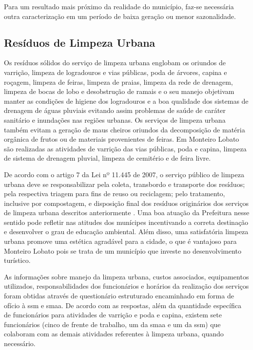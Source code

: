 Para um resultado mais próximo da realidade do município, faz-se necessária outra caracterização em um período de baixa geração ou menor sazonalidade.

\subsection{Resíduos de Limpeza Urbana}

Os resíduos sólidos do serviço de limpeza urbana englobam os oriundos de varrição, limpeza de logradouros e vias públicas, poda de árvores, capina e roçagem, limpeza de feiras, limpeza de praias, limpeza da rede de drenagem, limpeza de bocas de lobo e desobstrução de ramais \cite{brasil:12305, brasil:11445, ibam:2001} e o seu manejo objetivam manter as condições de higiene dos logradouros e a boa qualidade dos sistemas de drenagem de águas pluviais evitando assim problemas de saúde de caráter sanitário e inundações nas regiões urbanas. Os serviços de limpeza urbana também evitam a geração de maus cheiros oriundos da decomposição de matéria orgânica de frutos ou de materiais provenientes de feiras. Em Monteiro Lobato são realizadas as atividades de varrição das vias públicas, poda e capina, limpeza de sistema de drenagem pluvial, limpeza de cemitério e de feira livre.

De acordo com o artigo 7 da Lei nº 11.445 de 2007, o serviço público de limpeza urbana deve se responsabilizar pela coleta, transbordo e transporte dos resíduos; pela respectiva triagem para fins de reuso ou reciclagem; pelo tratamento, inclusive por compostagem, e disposição final dos resíduos originários dos serviços de limpeza urbana descritos anteriormente \cite{brasil:11445}. Uma boa atuação da Prefeitura nesse sentido pode refletir nas atitudes dos munícipes incentivando a correta destinação e desenvolver o grau de educação ambiental. Além disso, uma satisfatória limpeza urbana promove uma estética agradável para a cidade, o que é vantajoso para Monteiro Lobato pois se trata de um município que investe no desenvolvimento turístico.

As informações sobre manejo da limpeza urbana, custos associados, equipamentos utilizados, responsabilidades dos funcionários e horários da realização dos serviços foram obtidas através de questionário estruturado encaminhado em forma de ofício à \gls{ssm} e \gls{smaa}. De acordo com as respostas, além da quantidade específica de funcionários para atividades de varrição e poda e capina, existem sete funcionários (cinco de frente de trabalho, um da \gls{smaa} e um da \gls{ssm}) que colaboram com as demais atividades referentes à limpeza urbana, quando necessário.

